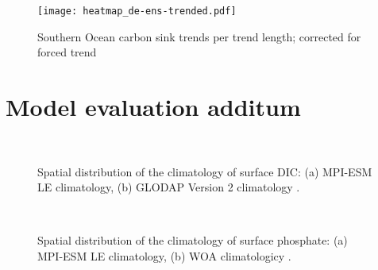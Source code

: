 \begin{figure}[h!]
	\texttt{[image: heatmap\_de-ens-trended.pdf]} %
\caption{Southern Ocean carbon sink trends per trend length; corrected for forced trend}
	\label{fig:heatmap_detrended}
\end{figure}



\clearpage
\section{Model evaluation additum}
\begin{figure}[bth]
        \myfloatalign
         \\
       \caption{Spatial distribution of the climatology of surface \acf{DIC}: (a) \acs{MPI-ESM LE} climatology, (b) \acf{GLODAP} Version 2 climatology \citep{GLODAPv2}.} \label{fig:SOCS_comp_DIC}
\end{figure}

\begin{figure}[bth]
        \myfloatalign
         \\
       \caption{Spatial distribution of the climatology of surface phosphate: (a) \acs{MPI-ESM LE} climatology, (b) \acf{WOA} climatologicy \citep{WOA2013}.} \label{fig:SOCS_comp_phosph}
\end{figure}


